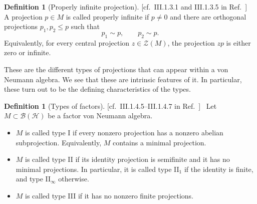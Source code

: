 \documentclass[aps,pra,reprint,superscriptaddress]{revtex4-2}
\newcommand{\cB}{{\mathcal B}}
\newcommand{\cH}{{\mathcal H}}
\newcommand{\cZ}{{\mathcal Z}}
\newcommand{\thmref}[1]{\textnormal{[#1]}\ }
\theoremstyle{definition}
\newtheorem{definition}[theorem]{Definition}
\theoremstyle{remark}
\begin{document}
\begin{definition}[Properly infinite projection]
\thmref{cf.~III.1.3.1 and III.1.3.5 in Ref.~\cite{Blackadar}}
A projection $p\in M$ is called properly infinite if $p\neq0$ and there are
orthogonal projections $p_1,p_2\leq p$ such that
\begin{equation}
    p_1\sim p,
    \qquad
    p_2\sim p.
\end{equation}
Equivalently, for every central projection $z\in\cZ(M)$, the projection $zp$
is either zero or infinite.
\end{definition}

These are the different types of projections that can appear within a von
Neumann algebra. We see that these are intrinsic features of it. In particular,
these turn out to be the defining characteristics of the types.

\begin{definition}[Types of factors]
\thmref{cf.~III.1.4.5--III.1.4.7 in Ref.~\cite{Blackadar}}
Let $M\subset\cB(\cH)$ be a factor von Neumann algebra.
\begin{itemize}
    \item[(i)] $M$ is called type I if every nonzero projection has a nonzero
    abelian subprojection. Equivalently, $M$ contains a minimal projection.
    \item[(ii)] $M$ is called type II if its identity projection is semifinite
    and it has no minimal projections. In particular, it is called type II$_1$
    if the identity is finite, and type II$_\infty$ otherwise.
    \item[(iii)] $M$ is called type III if it has no nonzero finite projections.
\end{itemize}
\end{definition}
\end{document}
